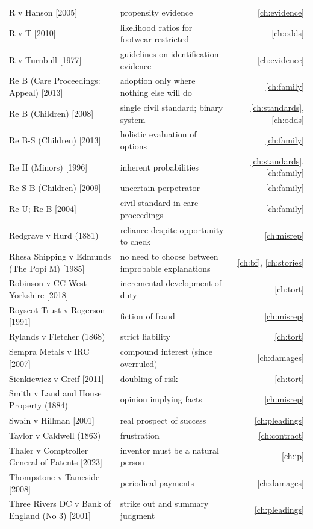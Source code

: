 \begin{longtable}{>{\raggedright\arraybackslash}p{3.7cm} >{\raggedright\arraybackslash}p{5.6cm} r}
R v Hanson [2005] & propensity evidence & \ref{ch:evidence}\\
R v T [2010] & likelihood ratios for footwear restricted & \ref{ch:odds}\\
R v Turnbull [1977] & guidelines on identification evidence & \ref{ch:evidence}\\
Re B (Care Proceedings: Appeal) [2013] & adoption only where nothing else will do & \ref{ch:family}\\
Re B (Children) [2008] & single civil standard; binary system & \ref{ch:standards}, \ref{ch:odds}\\
Re B-S (Children) [2013] & holistic evaluation of options & \ref{ch:family}\\
Re H (Minors) [1996] & inherent probabilities & \ref{ch:standards}, \ref{ch:family}\\
Re S-B (Children) [2009] & uncertain perpetrator & \ref{ch:family}\\
Re U; Re B [2004] & civil standard in care proceedings & \ref{ch:family}\\
Redgrave v Hurd (1881) & reliance despite opportunity to check & \ref{ch:misrep}\\
Rhesa Shipping v Edmunds (The Popi M) [1985] & no need to choose between improbable explanations & \ref{ch:bf}, \ref{ch:stories}\\
Robinson v CC West Yorkshire [2018] & incremental development of duty & \ref{ch:tort}\\
Royscot Trust v Rogerson [1991] & fiction of fraud & \ref{ch:misrep}\\
Rylands v Fletcher (1868) & strict liability & \ref{ch:tort}\\
Sempra Metals v IRC [2007] & compound interest (since overruled) & \ref{ch:damages}\\
Sienkiewicz v Greif [2011] & doubling of risk & \ref{ch:tort}\\
Smith v Land and House Property (1884) & opinion implying facts & \ref{ch:misrep}\\
Swain v Hillman [2001] & real prospect of success & \ref{ch:pleadings}\\
Taylor v Caldwell (1863) & frustration & \ref{ch:contract}\\
Thaler v Comptroller General of Patents [2023] & inventor must be a natural person & \ref{ch:ip}\\
Thompstone v Tameside [2008] & periodical payments & \ref{ch:damages}\\
Three Rivers DC v Bank of England (No 3) [2001] & strike out and summary judgment & \ref{ch:pleadings}\\

\end{longtable}
